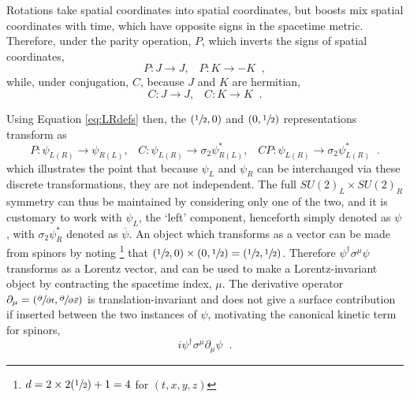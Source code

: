  Rotations take spatial coordinates into spatial coordinates, 
  but boosts mix spatial coordinates with time, 
  which have opposite signs in the spacetime metric.
 Therefore, under the parity operation, $P$, 
  which inverts the signs of spatial coordinates,
\begin{equation}\label{eq:parity}
 P: J\rightarrow J, \;\;\; P: K\rightarrow -K \;\; ,
\end{equation}
 while, under conjugation, $C$, 
 because $J$ and $K$ are hermitian,
\begin{equation}\label{eq:charge}
 C: J\rightarrow J, \;\;\; C: K\rightarrow K \;\; .
\end{equation}

 Using Equation \ref{eq:LRdefs} then, the $(\sfrac{1}{2},0)$ 
  and $(0,\sfrac{1}{2})$ representations transform as
\begin{equation}
 P:  \psi_{L(R)}\rightarrow \psi_{R(L)}, \;\;\;
 C:  \psi_{L(R)}\rightarrow \sigma_2 \psi_{R(L)}^{*}, \;\;\;
 CP: \psi_{L(R)}\rightarrow \sigma_2 \psi_{L(R)}^{*} \;\;.
\end{equation}
  which illustrates the point that
  because $\psi_L$ and $\psi_R$ can be interchanged
  via these discrete transformations, they are not
  independent.
 The full $SU(2)_L\times SU(2)_R$
  symmetry can thus be maintained by considering only 
  one of the two, and it is customary to work with $\psi_L$,
  the `left' component, henceforth simply denoted as $\psi$,
  with $\sigma_2\psi_R^{*}$ denoted as $\overline{\psi}$.
 An object which transforms as a vector can be
  made from spinors by noting
   \footnote{$d = 2 \times 2 (\sfrac{1}{2})+1 = 4 $ for $(t,x,y,z)$}
  that
  $(\sfrac{1}{2},0)\times(0,\sfrac{1}{2})=(\sfrac{1}{2},\sfrac{1}{2})$.
 Therefore $\psi^\dagger\sigma^\mu \psi$ transforms
  as a Lorentz vector, and can be used to make a 
  Lorentz-invariant object by contracting
  the spacetime index, $\mu$.
 The derivative operator 
  $\partial_\mu=(\sfrac{\partial}{\partial t},\sfrac{\partial}{\partial \vec{x}})$ 
  is translation-invariant and does not give
  a surface contribution if inserted between the
  two instances of $\psi$, motivating the canonical 
  kinetic term for spinors,
\begin{equation}\label{eq:canonKspinors}
 i\psi^\dagger \sigma^\mu \partial_\mu \psi \;\;.
\end{equation}
  
